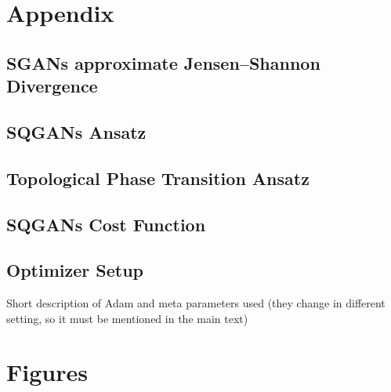 \chapter{Appendix}

\section{SGANs approximate Jensen–Shannon Divergence}
\label{apx:JSD}




\section{SQGANs Ansatz}
\label{apx:sqgans_ansatz}


\section{Topological Phase Transition Ansatz}
\label{apx:topological_phase_transition_ansatz}

\section{SQGANs Cost Function}
\label{apx:sqgans_cost_function}

\section{Optimizer Setup}
\label{apx:optimizer_setup}
Short description of Adam and meta parameters used (they change in different
setting, so it must be mentioned in the main text)
\chapter{Figures}
